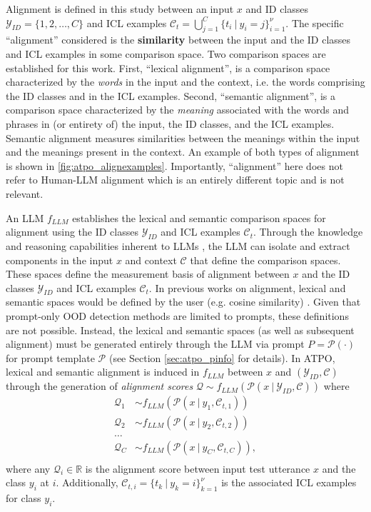Alignment is defined in this study between an input $x$ and ID classes $\mathcal{Y}_{ID} = \{1,2,\dots,C\}$ and ICL examples $\mathcal{C}_t = \bigcup_{j=1}^{C} \{t_i\ |\ y_i = j\}_{i=1}^{\nu}$. The specific ``alignment'' considered is the \textbf{similarity} between the input and the ID classes and ICL examples in some comparison space. Two comparison spaces are established for this work. First, ``lexical alignment'', is a comparison space characterized by the \textit{words} in the input and the context, i.e. the words comprising the ID classes and in the ICL examples. Second, ``semantic alignment'', is a comparison space characterized by the \textit{meaning} associated with the words and phrases in (or entirety of) the input, the ID classes, and the ICL examples. Semantic alignment measures similarities between the meanings within the input and the meanings present in the context. An example of both types of alignment is shown in \ref{fig:atpo_alignexamples}. Importantly, ``alignment'' here does not refer to Human-LLM alignment \cite{wang2023aligning,ji2023ai} which is an entirely different topic and is not relevant.

An LLM $f_{LLM}$ establishes the lexical and semantic comparison spaces for alignment using the ID classes $\mathcal{Y}_{ID}$ and ICL examples $\mathcal{C}_t$. Through the knowledge and reasoning capabilities inherent to LLMs \cite{kumar2025llm}, the LLM can isolate and extract components in the input $x$ and context $\mathcal{C}$ that define the comparison spaces. These spaces define the measurement basis of alignment between $x$ and the ID classes $\mathcal{Y}_{ID}$ and ICL examples $\mathcal{C}_t$. In previous works on alignment, lexical and semantic spaces would be defined by the user (e.g. cosine similarity) \cite{dyer2013simple,srivastava2025measuring}. Given that prompt-only OOD detection methods are limited to prompts, these definitions are not possible. Instead, the lexical and semantic spaces (as well as subsequent alignment) must be generated entirely through the LLM via prompt $P = \mathcal{P}(\cdot)$ for prompt template $\mathcal{P}$ (see Section \ref{sec:atpo_pinfo} for details). In ATPO, lexical and semantic alignment is induced in $f_{LLM}$ between $x$ and $(\mathcal{Y}_{ID},\mathcal{C})$ through the generation of \textit{alignment scores} $\mathcal{Q} \sim f_{LLM}(\mathcal{P}(x\ |\ \mathcal{Y}_{ID},\mathcal{C}))$ where
\begin{equation}
\begin{aligned}
    \mathcal{Q}_1 & \sim f_{LLM}(\mathcal{P}(x\ |\ y_1,\mathcal{C}_{t,1})) \\
    \mathcal{Q}_2 & \sim f_{LLM}(\mathcal{P}(x\ |\ y_2,\mathcal{C}_{t,2})) \\
    \dots \\
    \mathcal{Q}_C & \sim f_{LLM}(\mathcal{P}(x\ |\ y_C,\mathcal{C}_{t,C})), \\
\end{aligned}
\end{equation}
where any $\mathcal{Q}_i \in \mathbb{R}$ is the alignment score between input test utterance $x$ and the class $y_i$ at $i$. Additionally, $\mathcal{C}_{t,i} = \{t_k\ |\ y_k = i\}_{k=1}^{\nu}$ is the associated ICL examples for class $y_i$.

